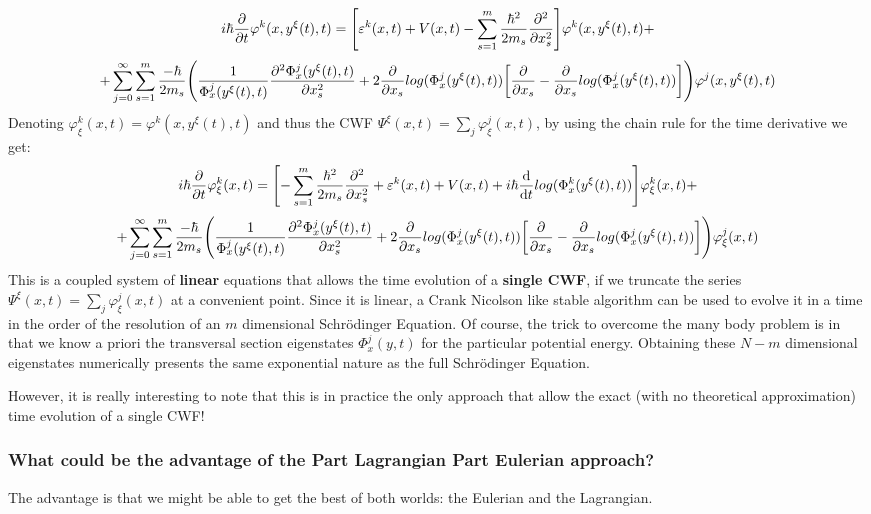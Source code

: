 \documentclass[11pt, a4paper]{article} %
\begin{document}
\begin{equation}
 i\hbar\pdv{}{t}\varphi^k(x,y^\xi(t),t)=\qty[ \varepsilon^k(x,t)+V(x,t)  -\sum_{s=1}^m\frac{\hbar^2}{2m_s}\pdv[2]{}{x_s} ]\varphi^k(x,y^\xi(t),t)+
\end{equation}
$$
+\sum_{j=0}^\infty\sum_{s=1}^m \frac{-\hbar}{2m_s}\qty( \frac{1}{\Phi^j_x(y^\xi(t),t)}\pdv[2]{\Phi^j_x(y^\xi(t),t)}{x_s}+2\pdv{}{x_s}log(\Phi^j_x(y^\xi(t),t))\qty[\pdv{}{x_s}-\pdv{}{x_s}log(\Phi^j_x(y^\xi(t),t))] )\varphi^j(x,y^\xi(t),t)
$$
Denoting $\varphi^k_\xi(x,t)=\varphi^k(x,y^\xi(t),t)$ and thus the CWF $\Psi^\xi(x,t)=\sum_j \varphi^j_\xi(x,t)$, by using the chain rule for the time derivative we get:
\begin{equation}\label{XabEq3}
 i\hbar\pdv{}{t}\varphi^k_\xi(x,t)=\qty[-\sum_{s=1}^m\frac{\hbar^2}{2m_s}\pdv[2]{}{x_s}+ \varepsilon^k(x,t)+V(x,t)   +i\hbar \dv{}{t}log(\Phi^k_x(y^\xi(t),t))]\varphi^k_\xi(x,t)+
\end{equation}
$$
+\sum_{j=0}^\infty\sum_{s=1}^m \frac{-\hbar}{2m_s}\qty( \frac{1}{\Phi^j_x(y^\xi(t),t)}\pdv[2]{\Phi^j_x(y^\xi(t),t)}{x_s}+2\pdv{}{x_s}log(\Phi^j_x(y^\xi(t),t))\qty[\pdv{}{x_s}-\pdv{}{x_s}log(\Phi^j_x(y^\xi(t),t))] )\varphi^j_\xi(x,t)
$$
This is a coupled system of {\bf linear} equations that allows the time evolution of a {\bf single CWF}, if we truncate the series $\Psi^\xi(x,t)=\sum_j \varphi^j_\xi(x,t)$ at a convenient point. Since it is linear, a Crank Nicolson like stable algorithm can be used to evolve it in a time in the order of the resolution of an $m$ dimensional Schrödinger Equation. Of course, the trick to overcome the many body problem is in that we know a priori the transversal section eigenstates $\Phi^j_x(y,t)$ for the particular potential energy. Obtaining these $N-m$ dimensional eigenstates numerically presents the same exponential nature as the full Schrödinger Equation.

However, it is really interesting to note that this is in practice the only approach that allow the exact (with no theoretical approximation) time evolution of a single CWF!



\subsubsection*{What could be the advantage of the Part Lagrangian Part Eulerian approach?}
The advantage is that we might be able to get the best of both worlds: the Eulerian and the Lagrangian.
\end{document}

